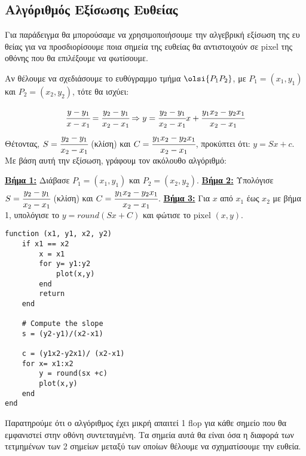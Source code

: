 \subsection{Αλγόριθμός Εξίσωσης Ευθείας}
Για παράδειγμα θα μπορούσαμε να χρησιμοποιήσουμε την αλγεβρική εξίσωση της ευ θείας για να προσδιορίσουμε ποια σημεία της ευθείας θα αντιστοιχούν σε pixel της οθόνης που θα επιλέξουμε να φωτίσουμε.

Αν θέλουμε να σχεδιάσουμε το ευθύγραμμο τμήμα $\olsi{P_1 P_2}$, με $P_1 = 
(x_1, y_1)$ και $P_2 = (x_2, y_2)$, τότε θα ισχύει:

\begin{equation*}
	\cfrac{y-y_1}{x-x_1} = \cfrac{y_2-y_1}{x_2-x_1} \Rightarrow y = \cfrac{y_2-y_1}{x_2-x_1}x + \cfrac{y_1x_2-y_2x_1}{x_2-x_1}
\end{equation*}
Θέτοντας, $S = \cfrac{y_2-y_1}{x_2-x_1}$ (κλίση) και $C = \cfrac{y_1x_2-y_2x_1}{x_2-x_1}$, προκύπτει ότι: $y=Sx+c$. Με βάση αυτή την εξίσωση, γράφουμ τον ακόλουθο αλγόριθμό:


\textbf{\underline{Βήμα 1:}} Διάβασε $P_1 = (x_1, y_1)$ και $P_2 = (x_2, y_2)$. \newline 
\textbf{\underline{Βήμα 2:}} Υπολόγισε $S = \cfrac{y_2-y_1}{x_2-x_1}$ (κλίση) και $C = \cfrac{y_1x_2-y_2x_1}{x_2-x_1}$. \newline 
\textbf{\underline{Βήμα 3:}} Για $x$ από $x_1$ έως $x_2$ με βήμα 1, υπολόγισε το $y = round(Sx+C)$ και φώτισε το pixel $(x,y)$. 
	
\begin{lstlisting}[caption={Plot Line Algorithm}]
function (x1, y1, x2, y2)
	if x1 == x2
		x = x1
		for y= y1:y2
			plot(x,y)
        end    
        return
	end	
    
    # Compute the slope
    s = (y2-y1)/(x2-x1)
    
    c = (y1x2-y2x1)/ (x2-x1)
    for x= x1:x2
    	y = round(sx +c)
    	plot(x,y)
    end    
end
\end{lstlisting}

Παρατηρούμε ότι ο αλγόριθμος έχει μικρή απαιτεί 1 flop για κάθε σημείο που θα εμφανιστεί στην οθόνη συντεταγμένη. Τα σημεία αυτά θα είναι όσα η διαφορά των τετμημένων των 2 σημείων μεταξύ των οποίων θέλουμε να σχηματίσουμε την ευθεία.

